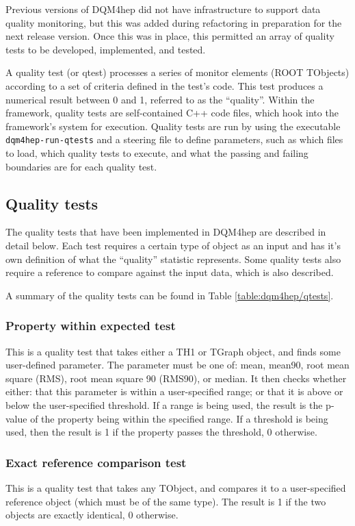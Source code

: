 Previous versions of \acrshort{DQM4hep} did not have infrastructure to support data quality monitoring, but this was added during refactoring in preparation for the next release version. Once this was in place, this permitted an array of quality tests to be developed, implemented, and tested. 

A quality test (or \acrshort{qtest}) processes a series of monitor elements (ROOT TObjects) according to a set of criteria defined in the test's code. This test produces a numerical result between 0 and 1, referred to as the ``quality''. Within the framework, quality tests are self-contained C++ code files, which hook into the framework's system for execution. Quality tests are run by using the executable \texttt{dqm4hep-run-qtests} and a steering file to define parameters, such as which files to load, which quality tests to execute, and what the passing and failing boundaries are for each quality test. 

\subsection{Quality tests}
The quality tests that have been implemented in \acrshort{DQM4hep} are described in detail below. Each test requires a certain type of object as an input and has it's own definition of what the ``quality'' statistic represents. Some quality tests also require a reference to compare against the input data, which is also described.

A summary of the quality tests can be found in Table \ref{table:dqm4hep/qtests}.

\subsubsection{Property within expected test}
\label{sec:property-qtest}
This is a quality test that takes either a TH1 or TGraph object, and finds some user-defined parameter. The parameter must be one of: mean, mean90, root mean square (RMS), root mean square 90 (RMS90), or median. It then checks whether either: that this parameter is within a user-specified range; or that it is above or below the user-specified threshold. If a range is being used, the result is the p-value of the property being within the specified range. If a threshold is being used, then the result is 1 if the property passes the threshold, 0 otherwise.

\subsubsection{Exact reference comparison test}
This is a quality test that takes any TObject, and compares it to a user-specified reference object (which must be of the same type). The result is 1 if the two objects are exactly identical, 0 otherwise. 

